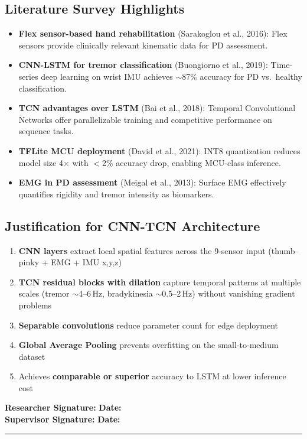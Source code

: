 \documentclass[12pt,a4paper]{article}
\newcommand{\sigblock}{%
  \vspace{0.6em}
  \noindent\textbf{Researcher Signature:} \underline{\hspace{6cm}} \quad \textbf{Date:} \underline{\hspace{3cm}}\\[0.4em]
  \noindent\textbf{Supervisor Signature:} \underline{\hspace{6cm}} \quad \textbf{Date:} \underline{\hspace{3cm}}
  \vspace{0.4em}\hrule\vspace{0.6em}
}
\begin{document}
\subsection{Literature Survey Highlights}
\begin{itemize}
  \item \textbf{Flex sensor-based hand rehabilitation} (Sarakoglou et al., 2016): Flex sensors provide clinically relevant kinematic data for PD assessment.
  \item \textbf{CNN-LSTM for tremor classification} (Buongiorno et al., 2019): Time-series deep learning on wrist IMU achieves $\sim$87\% accuracy for PD vs.\ healthy classification.
  \item \textbf{TCN advantages over LSTM} (Bai et al., 2018): Temporal Convolutional Networks offer parallelizable training and competitive performance on sequence tasks.
  \item \textbf{TFLite MCU deployment} (David et al., 2021): INT8 quantization reduces model size 4$\times$ with $<$2\% accuracy drop, enabling MCU-class inference.
  \item \textbf{EMG in PD assessment} (Meigal et al., 2013): Surface EMG effectively quantifies rigidity and tremor intensity as biomarkers.
\end{itemize}

\subsection{Justification for CNN-TCN Architecture}
\begin{enumerate}
  \item \textbf{CNN layers} extract local spatial features across the 9-sensor input (thumb--pinky + EMG + IMU x,y,z)
  \item \textbf{TCN residual blocks with dilation} capture temporal patterns at multiple scales (tremor $\sim$4--6\,Hz, bradykinesia $\sim$0.5--2\,Hz) without vanishing gradient problems
  \item \textbf{Separable convolutions} reduce parameter count for edge deployment
  \item \textbf{Global Average Pooling} prevents overfitting on the small-to-medium dataset
  \item Achieves \textbf{comparable or superior} accuracy to LSTM at lower inference cost
\end{enumerate}

\sigblock

\end{document}

